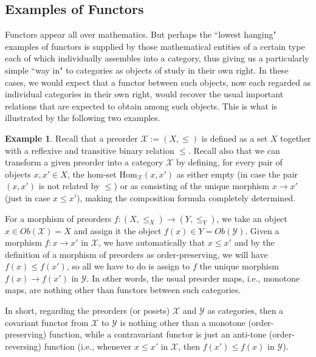\documentclass[11pt]{book}
\theoremstyle{definition}
\newtheorem{example}{Example}[section]
\theoremstyle{definition}
\theoremstyle{definition}
\theoremstyle{theorem}
\theoremstyle{definition}
\begin{document}
\subsection{Examples of Functors}
Functors appear all over mathematics. But perhaps the ``lowest hanging" examples of functors is supplied by those mathematical entities of a certain type each of which individually assembles into a category, thus giving us a particularly simple ``way in" to categories as objects of study in their own right. In these cases, we would expect that a functor between such objects, now each regarded as individual categories in their own right, would recover the usual important relations that are expected to obtain among such objects. This is what is illustrated by the following two examples.   
\begin{example}
	Recall that a preorder $\mathcal{X} := (X, \leq)$ is defined as a set $X$ together with a reflexive and transitive binary relation $\leq$. Recall also that we can transform a given preorder into a category $\mathcal{X}$ by defining, for every pair of objects $x,x' \in X$, the hom-set $\text{Hom}_{\mathcal{X}}(x,x')$ as either empty (in case the pair $(x,x')$ is not related by $\leq$) or as consisting of the unique morphism $x \rightarrow x'$ (just in case $x \leq x'$), making the composition formula completely determined. \par 
	For a morphism of preorders $f: (X, \leq_X) \rightarrow (Y, \leq_Y)$, we take an object $x \in Ob(\mathcal{X}) = X$ and assign it the object $f(x) \in Y = Ob(\mathcal{Y})$. Given a morphism $f: x \rightarrow x'$ in $\mathcal{X}$, we have automatically that $x \leq x'$ and by the definition of a morphism of preorders as order-preserving, we will have $f(x) \leq f(x')$, so all we have to do is assign to $f$ the unique morphism $f(x) \rightarrow f(x')$ in $\mathcal{Y}$. In other words, the usual preorder maps, i.e., monotone maps, are nothing other than functors between such categories. \par 
	In short, regarding the preorders (or posets) $\mathcal{X}$ and $\mathcal{Y}$ as categories, then a covariant functor from $\mathcal{X}$ to $\mathcal{Y}$ is nothing other than a monotone (order-preserving) function, while a contravariant functor is just an anti-tone (order-reversing) function (i.e., whenever $x \leq x'$ in $\mathcal{X}$, then $f(x') \leq f(x)$ in $\mathcal{Y}$).  
	\end{example} 
\end{document}
